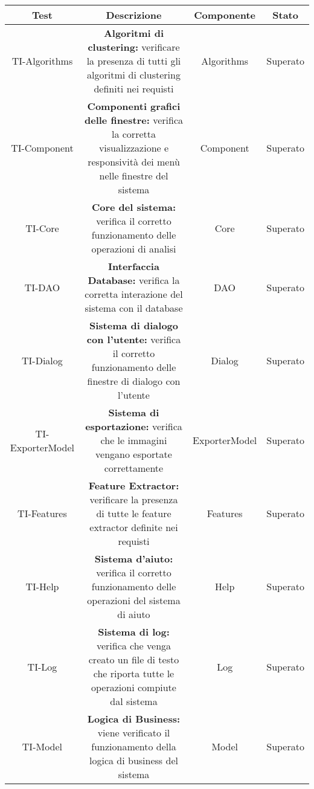 \newdimen\larghezza
\setlength{\larghezza}{7cm}
\newdimen\dimTipo
\setlength{\dimTipo}{2cm}
\newdimen\dimFonti
\setlength{\dimFonti}{2cm}
	
\begin{center}
\begin{longtable}{|c|c|c|c|}
\hline

\textbf{Test} & \textbf{Descrizione} & \textbf{Componente} & \textbf{Stato} \\


\hline
TI-Algorithms & \parbox[t]{\larghezza}{\textbf{Algoritmi di clustering:} verificare la presenza di tutti gli algoritmi di clustering definiti nei requisti}  & Algorithms & Superato \\ 
\hline
TI-Component & \parbox[t]{\larghezza}{\textbf {Componenti grafici delle finestre:} verifica la corretta visualizzazione e responsività dei menù nelle finestre del sistema}  & Component & Superato \\ 
\hline
TI-Core & \parbox[t]{\larghezza}{\textbf {Core del sistema:} verifica il corretto funzionamento delle operazioni di analisi}  & Core & Superato \\ 
\hline
TI-DAO & \parbox[t]{\larghezza}{\textbf {Interfaccia Database:} verifica la corretta interazione del sistema con il database}  & DAO & Superato \\ 
\hline
TI-Dialog & \parbox[t]{\larghezza}{\textbf {Sistema di dialogo con l'utente:} verifica il corretto funzionamento delle finestre di dialogo con l'utente}  & Dialog & Superato \\ 
\hline
TI-ExporterModel & \parbox[t]{\larghezza}{\textbf {Sistema di esportazione:} verifica che le immagini vengano esportate correttamente}  & ExporterModel & Superato \\ 
\hline
TI-Features & \parbox[t]{\larghezza}{\textbf{Feature Extractor:} verificare la presenza di tutte le feature extractor definite nei requisti}  & Features & Superato \\ 
\hline
TI-Help & \parbox[t]{\larghezza}{\textbf {Sistema d'aiuto:} verifica il corretto funzionamento delle operazioni del sistema di aiuto}  & Help & Superato \\ 
\hline
TI-Log & \parbox[t]{\larghezza}{\textbf {Sistema di log:} verifica che venga creato un file di testo che riporta tutte le operazioni compiute dal sistema}  & Log & Superato \\ 
\hline
TI-Model & \parbox[t]{\larghezza}{\textbf {Logica di Business:}  viene verificato il funzionamento della logica di business del sistema}  & Model & Superato \\ 

\end{longtable}
\end{center}
